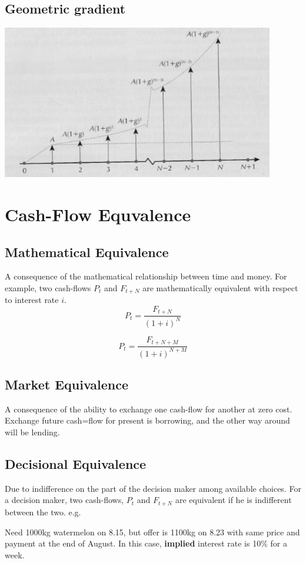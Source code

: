\documentclass{article}
\begin{document}
\subsection*{Geometric gradient}
\begin{center}
    \includegraphics[width=0.5\linewidth]{W2V2_5.png}
\end{center}

\section*{Cash-Flow Equvalence}

\subsection*{Mathematical Equivalence}
A consequence of the mathematical relationship between time and money. For example, two cash-flows $P_t$ and $F_{t+N}$ are mathematically equivalent with respect to interest rate $i$.
\[P_t = \frac{F_{t+N}}{(1+i)^N} \]

\[P_t = \frac{F_{t+N+M}}{(1+i)^{N+M}}\] 

\subsection*{Market Equivalence}
A consequence of the ability to exchange one cash-flow for another at zero cost. 
Exchange future cash=flow for present is borrowing, and the other way around will be lending. 

\subsection*{Decisional Equivalence}
Due to indifference on the part of the decision maker among available choices. 
For a decision maker, two cash-flows, $P_t$ and $F_{t+N}$ are equivalent if he is indifferent between the two. e.g.

Need 1000kg watermelon on 8.15, but offer is 1100kg on 8.23 with same price and payment at the end of August. 
In this case, \textbf{implied} interest rate is 10\% for a week.
\end{document}
